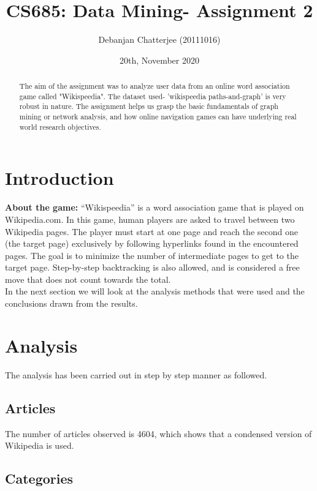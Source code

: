 \documentclass[a4paper,11pt]{article}
\title{CS685: Data Mining- Assignment 2 }
\author{Debanjan Chatterjee (20111016)}
\date{20th, November 2020} %
\begin{document}
\maketitle

\begin{abstract}
The aim of the assignment was to analyze user data from an online word association game called "Wikispeedia". The dataset used- 'wikispeedia paths-and-graph' is very robust in nature. The assignment helps us grasp the basic fundamentals of graph mining or network analysis, and how online navigation games can have underlying real world research objectives. 

\end{abstract}

\section{Introduction}


\textbf{About the game:} “Wikispeedia” is a word association game that is played on Wikipedia.com. In this game, human players are asked to travel between two Wikipedia pages. The player must start at one page and reach the second one (the target page) exclusively by following hyperlinks found in the encountered pages. The goal is to minimize the number of intermediate pages to get to the target page. Step-by-step backtracking is also allowed, and is considered a free move that does not count towards the total.\cite{west2009wikispeedia}
\\ 
In the next section we will look at the analysis methods that were used and the conclusions drawn from the results.



\section{Analysis}

The analysis has been carried out in step by step manner as followed.

\subsection{Articles}

The number of articles observed is 4604, which shows that a condensed version of Wikipedia is used. 


\subsection{Categories}
\end{document}
